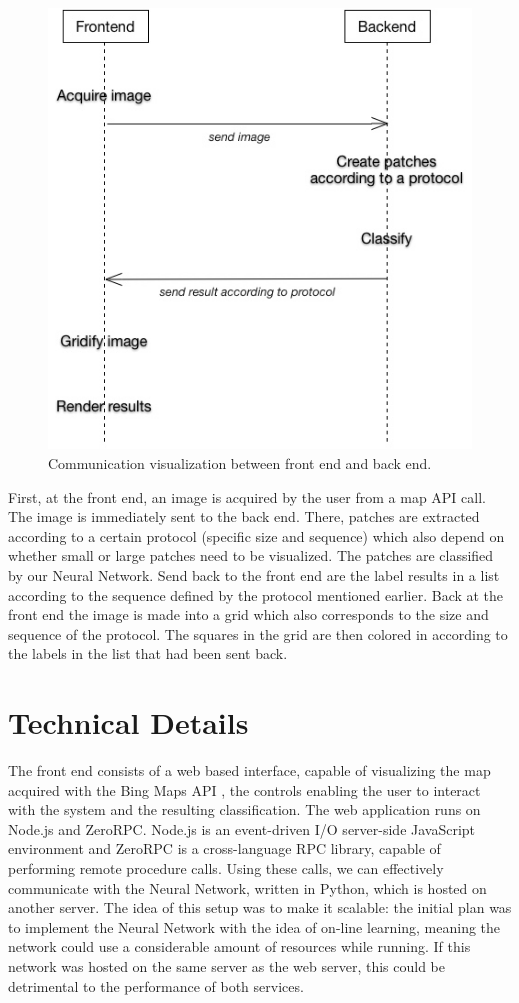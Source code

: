 \documentclass[a4paper,onecolumn]{report}
\begin{document}
\begin{figure}[h!]
    \centering
    \includegraphics[scale=0.5]{./images/communication2.jpg}
    \caption{Communication visualization between front end and back end.}
	\label{fig:communication}
\end{figure}

First, at the front end, an image is acquired by the user from a map API call. The image is immediately sent to the back end. There, patches are extracted according to a certain protocol (specific size and sequence) which also depend on whether small or large patches need to be visualized. The patches are classified by our Neural Network. Send back to the front end are the label results in a list according to the sequence defined by the protocol mentioned earlier. Back at the front end the image is made into a grid which also corresponds to the size and sequence of the protocol. The squares in the grid are then colored in according to the labels in the list that had been sent back.

\section{Technical Details}
The front end consists of a web based interface, capable of visualizing the map acquired with the Bing Maps API \cite{bing}, the controls enabling the user to interact with the system and the resulting classification. The web application runs on Node.js and ZeroRPC. Node.js is an event-driven I/O server-side JavaScript environment and ZeroRPC is a cross-language RPC library, capable of performing remote procedure calls. Using these calls, we can effectively communicate with the Neural Network, written in Python, which is hosted on another server. The idea of this setup was to make it scalable: the initial plan was to implement the Neural Network with the idea of on-line learning, meaning the network could use a considerable amount of resources while running. If this network was hosted on the same server as the web server, this could be detrimental to the performance of both services.
\end{document}
